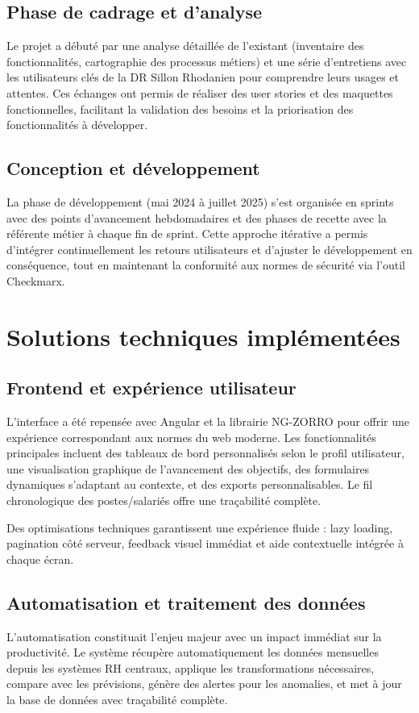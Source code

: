 \subsection{Phase de cadrage et d'analyse}
Le projet a débuté par une analyse détaillée de l'existant (inventaire des fonctionnalités, cartographie des processus métiers) et une série d'entretiens avec les utilisateurs clés de la DR Sillon Rhodanien pour comprendre leurs usages et attentes. Ces échanges ont permis de réaliser des user stories et des maquettes fonctionnelles, facilitant la validation des besoins et la priorisation des fonctionnalités à développer.

\subsection{Conception et développement}
La phase de développement (mai 2024 à juillet 2025) s'est organisée en sprints avec des points d'avancement hebdomadaires et des phases de recette avec la référente métier à chaque fin de sprint. Cette approche itérative a permis d'intégrer continuellement les retours utilisateurs et d'ajuster le développement en conséquence, tout en maintenant la conformité aux normes de sécurité via l'outil Checkmarx.

\section{Solutions techniques implémentées}

\subsection{Frontend et expérience utilisateur}
L'interface a été repensée avec Angular et la librairie NG-ZORRO pour offrir une expérience correspondant aux normes du web moderne. Les fonctionnalités principales incluent des tableaux de bord personnalisés selon le profil utilisateur, une visualisation graphique de l'avancement des objectifs, des formulaires dynamiques s'adaptant au contexte, et des exports personnalisables. Le fil chronologique des postes/salariés offre une traçabilité complète.

Des optimisations techniques garantissent une expérience fluide : lazy loading, pagination côté serveur, feedback visuel immédiat et aide contextuelle intégrée à chaque écran.

\subsection{Automatisation et traitement des données}
L'automatisation constituait l'enjeu majeur avec un impact immédiat sur la productivité. Le système récupère automatiquement les données mensuelles depuis les systèmes RH centraux, applique les transformations nécessaires, compare avec les prévisions, génère des alertes pour les anomalies, et met à jour la base de données avec traçabilité complète.

